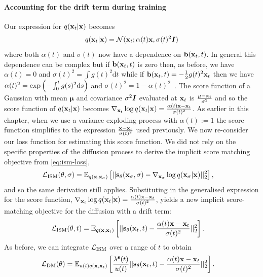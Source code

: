 \paragraph{Accounting for the drift term during training}
Our expression for $q({\mathbf{x}}_t|{\mathbf{x}})$ becomes
\begin{align} \label{eq:vp-diffusion-q-noising}
    q({\mathbf{x}}_t|{\mathbf{x}}) = {\mathcal{N}}({\mathbf{x}}_t; \alpha(t){\mathbf{x}}, \sigma(t)^2{\bm{I}})
\end{align}
where both $\alpha(t)$ and $\sigma(t)$ now have a dependence on ${\mathbf{b}}({\mathbf{x}}_t, t)$. In general this dependence can be complex but if ${\mathbf{b}}({\mathbf{x}}_t, t)$ is zero then, as before, we have $\alpha(t) = 0$ and $\sigma(t)^2 = \int g(t)^2 \mathrm{d}t$ while if ${\mathbf{b}}({\mathbf{x}}_t, t) = - \frac{1}{2}g(t)^2{\mathbf{x}}_t$ then we have $\alpha(t)^2 = \text{exp}\left( - \int_0^t g(s)^2 \mathrm{d} s \right)$ and $\sigma(t)^2 = 1 - \alpha(t)^2$~\citep{song2020score}. The score function of a Gaussian with mean $\mathbf{\mu}$ and covariance $\sigma^2{\bm{I}}$ evaluated at ${\mathbf{x}}_t$ is $\frac{\mathbf{\mu} - {\mathbf{x}}_t}{\sigma^2}$ and so the score function of $q({\mathbf{x}}_t|{\mathbf{x}})$ becomes $\nabla_{{\mathbf{x}}_t} \log q({\mathbf{x}}_t|{\mathbf{x}}) = \frac{\alpha(t){\mathbf{x}} - {\mathbf{x}}_t}{\sigma(t)^2}$. As earlier in this chapter, when we use a variance-exploding process with $\alpha(t) := 1$ the score function simplifies to the expression $\frac{{\mathbf{x}}-{\mathbf{x}}_t}{\sigma(t)^2}$ used previously. We now re-consider our loss function for estimating this score function. We did not rely on the specific properties of the diffusion process to derive the implicit score matching objective from \cref{eq:ism-loss},
\begin{align} \label{eq:ism-loss-with-drift}
    \mathcal{L}_\text{ISM}(\theta, \sigma) &= \mathbb{E}_{q({\mathbf{x}}, {\mathbf{x}}_\sigma)} \left[ 
    || {\mathbf{s}}_\theta({\mathbf{x}}_\sigma, \sigma) - \nabla_{{\mathbf{x}}_\sigma} \log q({\mathbf{x}}_\sigma|{\mathbf{x}}) ||_2^2 \right],
\end{align}
and so the same derivation still applies. Substituting in the generalised expression for the score function, $\nabla_{{\mathbf{x}}_t} \log q({\mathbf{x}}_t|{\mathbf{x}}) = \frac{\alpha(t){\mathbf{x}} - {\mathbf{x}}_t}{\sigma(t)^2}$, yields a new implicit score-matching objective for the diffusion with a drift term:
\begin{align}
    \mathcal{L}_\text{ISM}(\theta, t) &= \mathbb{E}_{q({\mathbf{x}}, {\mathbf{x}}_t)} \left[ || {\mathbf{s}}_\theta({\mathbf{x}}_t, t) - \frac{\alpha(t){\mathbf{x}} - {\mathbf{x}}_t}{\sigma(t)^2} ||_2^2 \right].
\end{align}
As before, we can integrate ${\mathcal{L}}_\text{ISM}$ over a range of $t$ to obtain
\begin{align} \label{eq:general-dm-loss}
    \mathcal{L}_\text{DM}(\theta) &= \mathbb{E}_{u(t)q({\mathbf{x}}, {\mathbf{x}}_t)} \left[ \frac{\lambda^{\mathbf{s}}(t)}{u(t)} || {\mathbf{s}}_\theta({\mathbf{x}}_t, t) - \frac{\alpha(t) {\mathbf{x}}-{\mathbf{x}}_t}{\sigma(t)^2} ||_2^2 \right].
\end{align}
